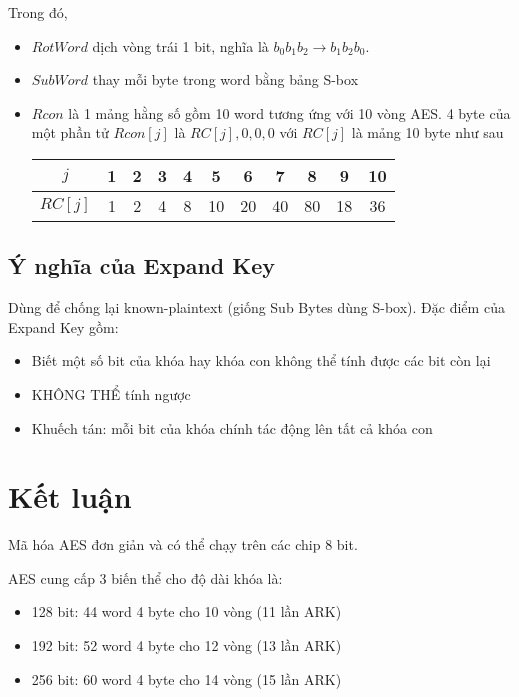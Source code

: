 Trong đó, 
\begin{itemize}
    \item $RotWord$ dịch vòng trái 1 bit, nghĩa là $b_0 b_1 b_2 \rightarrow b_1 b_2 b_0$.
    \item $SubWord$ thay mỗi byte trong word bằng bảng S-box
    \item $Rcon$ là 1 mảng hằng số gồm 10 word tương ứng với 10 vòng AES. 4 byte của một phần tử $Rcon[j]$ là $RC[j], 0, 0, 0$ với $RC[j]$ là mảng 10 byte như sau
    \begin{center}
        \begin{tabular}{|c|c|c|c|c|c|c|c|c|c|c|}
            \hline
            $j$ & 1 & 2 & 3 & 4 & 5 & 6 & 7 & 8 & 9 & 10 \\
            \hline
            $RC[j]$ & 1 & 2 & 4 & 8 & 10 & 20 & 40 & 80 & 18 & 36 \\
            \hline
        \end{tabular}
    \end{center}
    
\end{itemize}

\subsection{Ý nghĩa của Expand Key}

Dùng để chống lại known-plaintext (giống Sub Bytes dùng S-box). Đặc điểm của Expand Key gồm:

\begin{itemize}
    \item Biết một số bit của khóa hay khóa con không thể tính được các bit còn lại
    \item KHÔNG THỂ tính ngược
    \item Khuếch tán: mỗi bit của khóa chính tác động lên tất cả khóa con
\end{itemize}

\section{Kết luận}

Mã hóa AES đơn giản và có thể chạy trên các chip 8 bit.

AES cung cấp 3 biến thể cho độ dài khóa là:

\begin{itemize}
    \item 128 bit: 44 word 4 byte cho 10 vòng (11 lần ARK)
    \item 192 bit: 52 word 4 byte cho 12 vòng (13 lần ARK)
    \item 256 bit: 60 word 4 byte cho 14 vòng (15 lần ARK)
\end{itemize}